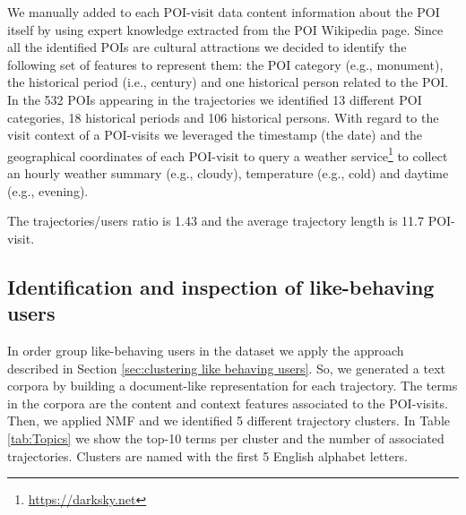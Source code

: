 We manually added to each POI-visit data content information about the POI itself by using expert knowledge extracted from the POI Wikipedia page. Since all the identified POIs are cultural attractions we decided to identify the following set of features to represent them: 
the POI category (e.g., monument), the historical period (i.e., century) and one historical person related to the POI. In the 532 POIs appearing in the trajectories we identified 13 different POI categories, 18 historical periods and 106 historical persons. 
With regard to the visit context of a POI-visits we leveraged the timestamp (the date) and the geographical coordinates of each POI-visit to query a weather service\footnote{\url{https://darksky.net}} to collect an hourly weather summary (e.g., cloudy), temperature (e.g., cold) and daytime (e.g., evening). 

The trajectories/users ratio is 1.43 and the average trajectory length is 11.7 POI-visit. 

\subsection{Identification and inspection of like-behaving users}
In order group like-behaving users in the dataset we apply the approach described in Section \ref{sec:clustering like behaving users}. So, we generated a text corpora by building a document-like representation for each trajectory. The terms in the corpora are the content and context features associated to the POI-visits. Then, we applied NMF and we identified 5 different trajectory clusters.
In Table \ref{tab:Topics} we show the top-10 terms per cluster and the number of associated trajectories. Clusters are named with the first 5 English alphabet letters.

